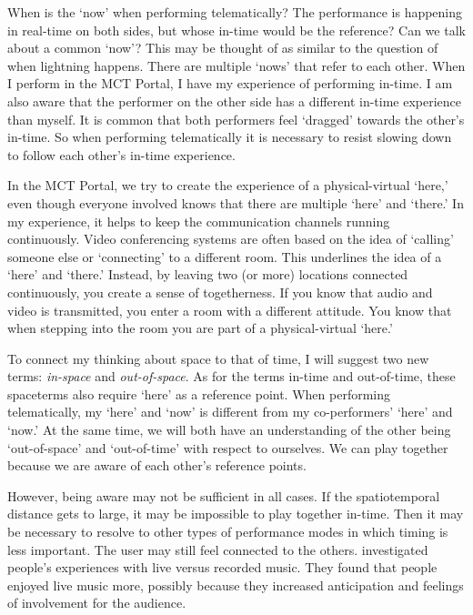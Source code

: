 When is the `now' when performing telematically? The performance is happening in real-time on both sides, but whose in-time would be the reference? Can we talk about a common `now'? This may be thought of as similar to the question of when lightning happens. There are multiple `nows' that refer to each other. When I perform in the MCT Portal, I have my experience of performing in-time. I am also aware that the performer on the other side has a different in-time experience than myself. It is common that both performers feel `dragged' towards the other's in-time. So when performing telematically it is necessary to resist slowing down to follow each other's in-time experience.

In the MCT Portal, we try to create the experience of a physical-virtual `here,' even though everyone involved knows that there are multiple `here' and `there.' In my experience, it helps to keep the communication channels running continuously. Video conferencing systems are often based on the idea of `calling' someone else or `connecting' to a different room. This underlines the idea of a `here' and `there.' Instead, by leaving two (or more) locations connected continuously, you create a sense of togetherness. If you know that audio and video is transmitted, you enter a room with a different attitude. You know that when stepping into the room you are part of a physical-virtual `here.'

To connect my thinking about space to that of time, I will suggest two new terms: \emph{in-space} and \emph{out-of-space}. As for the terms in-time and out-of-time, these spaceterms also require `here' as a reference point. When performing telematically, my `here' and `now' is different from my co-performers' `here' and `now.' At the same time, we will both have an understanding of the other being `out-of-space' and `out-of-time' with respect to ourselves. We can play together because we are aware of each other's reference points.

However, being aware may not be sufficient in all cases. If the spatiotemporal distance gets to large, it may be impossible to play together in-time. Then it may be necessary to resolve to other types of performance modes in which timing is less important. The user may still feel connected to the others. \citet{swarbrick_how_2019} investigated people's experiences with live versus recorded music. They found that people enjoyed live music more, possibly because they increased anticipation and feelings of involvement for the audience.


